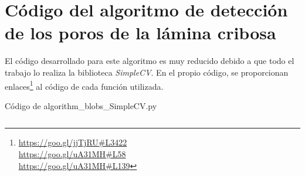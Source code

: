 \chapter{Código del algoritmo de detección de los poros de la lámina
  cribosa}

El código desarrollado para este algoritmo es muy reducido debido a
que todo el trabajo lo realiza la biblioteca \emph{SimpleCV}. En el
propio código, se proporcionan
enlaces\footnote{\url{https://goo.gl/jjTjRU\#L3422}
  \\\url{https://goo.gl/uA31MH\#L58}
  \\
  \url{https://goo.gl/uA31MH\#L139}}
al código de cada función utilizada.
\begin{codigo_python}
\caption{Código de algorithm\_blobs\_SimpleCV.py}
  \inputminted[fontsize=\scriptsize, linenos, breaklines]{python}{../OpenCV/algorithm_blobs_SimpleCV.py}
\end{codigo_python}